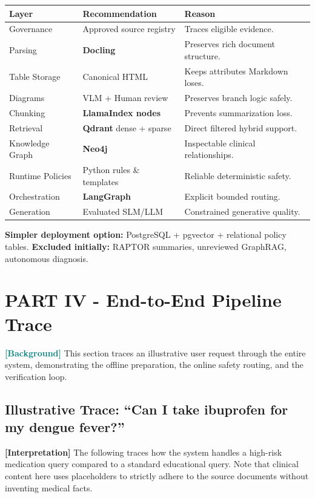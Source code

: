 \documentclass[11pt,a4paper]{article}
\newcommand{\origintag}[2]{\textcolor{#1}{\small\textbf{[#2]}}}
\begin{document}
\begin{table}[ht]
\centering
{}
\begin{tabular}{lll}
\toprule
\textbf{Layer} & \textbf{Recommendation} & \textbf{Reason} \\
\midrule
Governance & Approved source registry & Traces eligible evidence. \\
Parsing & \textbf{Docling} & Preserves rich document structure. \\
Table Storage & Canonical HTML & Keeps attributes Markdown loses. \\
Diagrams & VLM + Human review & Preserves branch logic safely. \\
Chunking & \textbf{LlamaIndex nodes} & Prevents summarization loss. \\
Retrieval & \textbf{Qdrant} dense + sparse & Direct filtered hybrid support. \\
Knowledge Graph & \textbf{Neo4j} & Inspectable clinical relationships. \\
Runtime Policies & Python rules \& templates & Reliable deterministic safety. \\
Orchestration & \textbf{LangGraph} & Explicit bounded routing. \\
Generation & Evaluated SLM/LLM & Constrained generative quality. \\
\bottomrule
\end{tabular}
\end{table}

\textbf{Simpler deployment option:} PostgreSQL + pgvector + relational policy tables.
\textbf{Excluded initially:} RAPTOR summaries, unreviewed GraphRAG, autonomous diagnosis.

\newpage
\section{PART IV - End-to-End Pipeline Trace}

\origintag{teal}{Background} This section traces an illustrative user request through the entire system, demonstrating the offline preparation, the online safety routing, and the verification loop. 

\subsection{Illustrative Trace: ``Can I take ibuprofen for my dengue fever?''}
\origintag{slate}{Interpretation} The following traces how the system handles a high-risk medication query compared to a standard educational query. Note that clinical content here uses placeholders to strictly adhere to the source documents without inventing medical facts.
\end{document}
